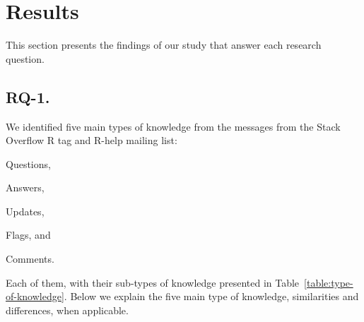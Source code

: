 \section{Results}
\label{cha:findings}

This section presents the findings of our study that answer each research question.

\subsection{RQ-1. \rqa}
\label{cha:findings-types}

We identified five main types of knowledge from the messages from the Stack Overflow R tag and R-help mailing list:
	\begin{enumerate*}[label=(\arabic*)]
        \item Questions,
        \item Answers,
        \item Updates,
        \item Flags, and
        \item Comments.
	\end{enumerate*}
    Each of them, with their sub-types of knowledge presented in Table~\ref{table:type-of-knowledge}.
    Below we explain the five main type of knowledge, similarities and differences, when applicable.

